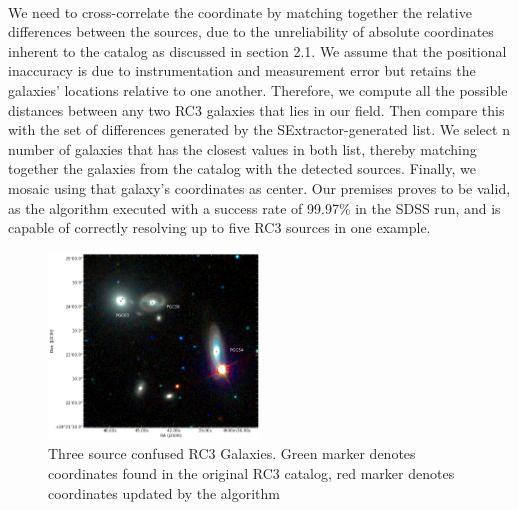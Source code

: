 \documentclass[authoryear, 12pt,5p, times]{elsarticle}
\begin{document}
\\
\indent  We need to cross-correlate the coordinate by matching together the relative differences between the sources, due to the unreliability of absolute coordinates inherent to the catalog as discussed in section 2.1. We assume that the positional inaccuracy is due to  instrumentation and measurement error but retains the galaxies' locations relative to one another.  %
Therefore, we compute all the possible distances between any two RC3 galaxies that lies in our field. Then compare this with the set of differences generated by the SExtractor-generated list. We select n number of galaxies that has the closest values in both list, thereby matching together the galaxies from the catalog  with the detected sources. Finally, we mosaic using that galaxy's coordinates as center. Our premises proves to be valid, as the algorithm executed with a success rate of 99.97\% in the SDSS run, and is capable of correctly resolving up to five RC3 sources in one example.
		\begin{figure}[h]
		\includegraphics[width=0.5\textwidth]{figures/navigator}
		\caption{Three source confused RC3 Galaxies. Green marker denotes coordinates found in the original RC3 catalog, red marker denotes coordinates updated by the algorithm}
		\label{fig:positional_update_plot}
	\end{figure}
\end{document}
